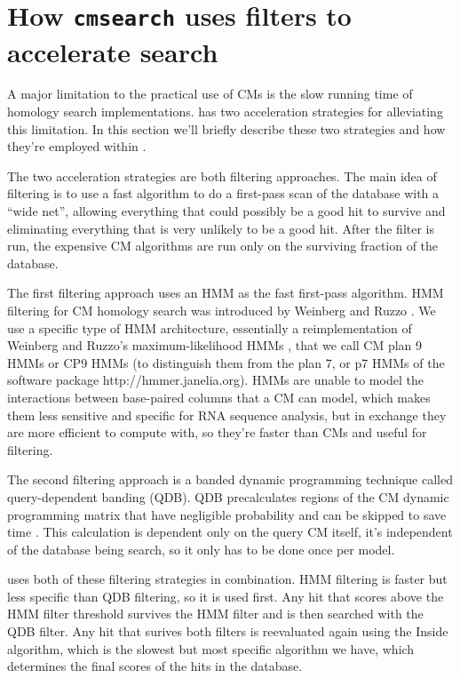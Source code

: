 \section{How \texttt{cmsearch} uses filters to accelerate search}

A major limitation to the practical use of CMs is the slow running
time of homology search implementations.  has two
acceleration strategies for alleviating this limitation. In this
section we'll briefly describe these two strategies and how they're
employed within .

The two acceleration strategies are both filtering approaches.  The
main idea of filtering is to use a fast algorithm to do a first-pass
scan of the database with a ``wide net'', allowing everything that
could possibly be a good hit to survive and eliminating everything
that is very unlikely to be a good hit. After the filter is run, the
expensive CM algorithms are run only on the surviving fraction of the
database.

The first filtering approach uses an HMM as the fast first-pass
algorithm. HMM filtering for CM homology search was introduced by
Weinberg and Ruzzo
\cite{WeinbergRuzzo04,WeinbergRuzzo04b,WeinbergRuzzo06}. We use a
specific type of HMM architecture, essentially a reimplementation of
Weinberg and Ruzzo's maximum-likelihood HMMs \cite{WeinbergRuzzo06},
that we call CM plan 9 HMMs or CP9 HMMs (to distinguish them from the
plan 7, or p7 HMMs of the  software package
http://hmmer.janelia.org). HMMs are unable to model the interactions
between base-paired columns that a CM can model, which makes them less
sensitive and specific for RNA sequence analysis, but in exchange they
are more efficient to compute with, so they're faster than CMs and
useful for filtering.

The second filtering approach is a banded dynamic programming
technique called query-dependent banding (QDB). QDB precalculates
regions of the CM dynamic programming matrix that have negligible
probability and can be skipped to save time
\cite{NawrockiEddy07}. This calculation is dependent only on the query
CM itself, it's independent of the database being search, so it only
has to be done once per model. 

 uses both of these filtering strategies in
combination. HMM filtering is faster but less specific than QDB
filtering, so it is used first. Any hit that scores above the HMM
filter threshold survives the HMM filter and is then searched with the
QDB filter. Any hit that surives both filters is reevaluated again
using the Inside algorithm, which is the slowest but most specific
algorithm we have, which determines the final scores of the hits in
the database.

